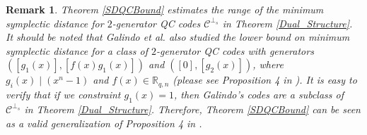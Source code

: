 \documentclass[journal]{IEEEtran}
\newtheorem{theorem}{Theorem}
\newtheorem{remark}{Remark}
\begin{document}


%	

\begin{remark}\label{improve_bound_Galindo}
Theorem \ref{SDQCBound} estimates the range of the minimum symplectic distance for $2$-generator QC codes $\mathscr{C}^{\perp_s}$ in Theorem \ref{Dual_Structure}. 
It should be noted that Galindo et al. also studied the lower bound on minimum symplectic distance for a class of  $2$-generator QC codes with generators $(\left[g_1(x)\right],\left[f(x)g_1(x)\right])$ and $([0],\left[g_2(x)\right])$, where $g_i(x) \mid (x^n-1)$ and $f(x)\in \mathbb{R}_{q,n}$ (please see Proposition 4 in \cite{galindo2018quasi}). 
It is easy to verify that if we constraint $g_1(x)=1$, then Galindo's codes are a subclass of $\mathscr{C}^{\perp_s}$ in Theorem \ref{Dual_Structure}.   Therefore,
Theorem \ref{SDQCBound} can be seen as a valid  generalization of Proposition 4 in \cite{galindo2018quasi}. 
\end{remark}
\end{document}
